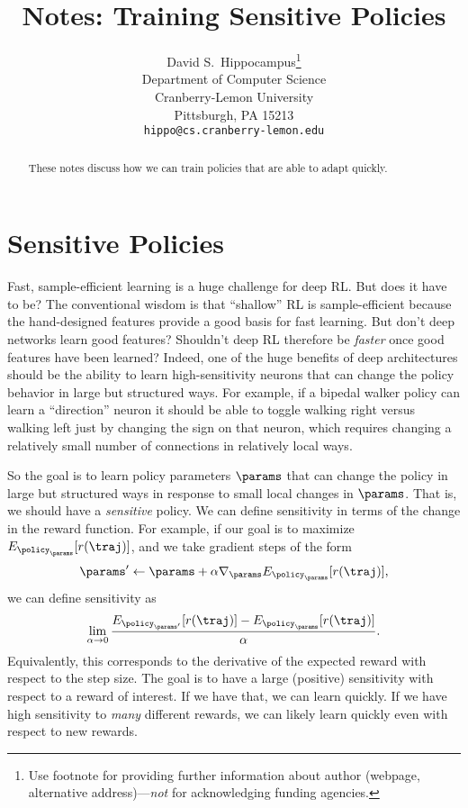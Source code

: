 \documentclass{article}
\title{Notes: Training Sensitive Policies}
\author{
  David S.~Hippocampus\thanks{Use footnote for providing further
    information about author (webpage, alternative
    address)---\emph{not} for acknowledging funding agencies.} \\
  Department of Computer Science\\
  Cranberry-Lemon University\\
  Pittsburgh, PA 15213 \\
  \texttt{hippo@cs.cranberry-lemon.edu} \\
}
\begin{document}

\maketitle


\begin{abstract} 

These notes discuss how we can train policies that are able to adapt quickly.

\end{abstract} 


\section{Sensitive Policies}
\label{sec:sensitivity}

Fast, sample-efficient learning is a huge challenge for deep RL. But does it have to be? The conventional wisdom is that ``shallow'' RL is sample-efficient because the hand-designed features provide a good basis for fast learning. But don't deep networks learn good features? Shouldn't deep RL therefore be \emph{faster} once good features have been learned? Indeed, one of the huge benefits of deep architectures should be the ability to learn high-sensitivity neurons that can change the policy behavior in large but structured ways. For example, if a bipedal walker policy can learn a ``direction'' neuron it should be able to toggle walking right versus walking left just by changing the sign on that neuron, which requires changing a relatively small number of connections in relatively local ways.

So the goal is to learn policy parameters $\params$ that can change the policy in large but structured ways in response to small local changes in $\params$. That is, we should have a \emph{sensitive} policy. We can define sensitivity in terms of the change in the reward function. For example, if our goal is to maximize $E_{\policy_\params}[r(\traj)]$, and we take gradient steps of the form
\[
\params' \leftarrow \params + \alpha\nabla_\params E_{\policy_\params}[r(\traj)],
\]
we can define sensitivity as
\[
\lim_{\alpha \rightarrow 0} \frac{E_{\policy_{\params'}}[r(\traj)] - E_{\policy_\params}[r(\traj)]}{\alpha}.
\]
Equivalently, this corresponds to the derivative of the expected reward with respect to the step size. The goal is to have a large (positive) sensitivity with respect to a reward of interest. If we have that, we can learn quickly. If we have high sensitivity to \emph{many} different rewards, we can likely learn quickly even with respect to new rewards.
\end{document}

